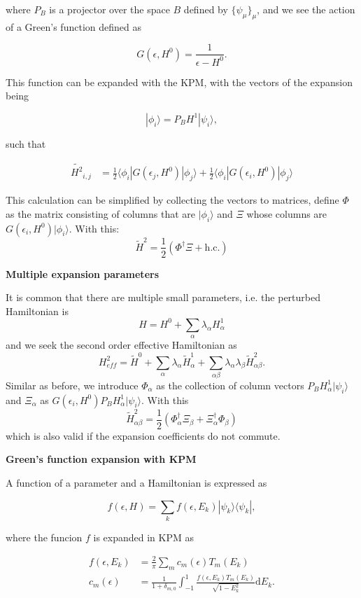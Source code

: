 \documentclass[10pt, onecolumn, aps, prb, superscriptaddress, floatfix, showpacs, notitlepage]{revtex4-1}
\newcommand{\bra}[1]{\langle #1|}
\newcommand{\ket}[1]{|#1\rangle}
\begin{document}
where $P_B$ is a projector over the space $B$ defined by $\{\psi_\mu\}_\mu$,
and we see the action of a Green's function defined as

$$
G(\epsilon, H^0) = \frac{1}{\epsilon-H^0}.
$$

This function can be expanded with the KPM, with the vectors of the expansion
being

$$
\ket{\phi_i} = P_B H^1\ket{\psi_i},
$$


such that


\begin{align}
\tilde{H^2}_{i,j} &= \frac{1}{2}
\bra{\phi_i} G(\epsilon_j, H^0) \ket{\phi_j}
+
\frac{1}{2}
\bra{\phi_i} G(\epsilon_i, H^0) \ket{\phi_j}
\end{align}

This calculation can be simplified by collecting the vectors to matrices, define $\Phi$ as the matrix consisting of columns that are $\ket{\phi_i}$ and $\Xi$ whose columns are $G(\epsilon_i, H^0) \ket{\phi_i}$. With this:
\begin{equation}
\tilde{H}^2 = \frac{1}{2} (\Phi^\dag \Xi + \text{h.c.})
\end{equation}

\textbf{Multiple expansion parameters}

It is common that there are multiple small parameters, i.e. the perturbed Hamiltonian is
\[H = H^0 + \sum_{\alpha} \lambda_{\alpha} H^1_{\alpha}\]
and we seek the second order effective Hamiltonian as
\[H_{eff}^2 = \tilde{H}^0 +  \sum_{\alpha} \lambda_{\alpha} \tilde{H}^1_{\alpha} +  \sum_{\alpha\beta} \lambda_{\alpha}\lambda_{\beta}\tilde{H}^2_{\alpha\beta}.\]
Similar as before, we introduce $\Phi_{\alpha}$ as the collection of column vectors $P_B H^1_{\alpha}\ket{\psi_i}$ and $\Xi_{\alpha}$ as $G(\epsilon_i, H^0) P_B H^1_{\alpha}\ket{\psi_i}$. With this
\[\tilde{H}^2_{\alpha\beta} = \frac{1}{2} (\Phi_{\alpha}^\dag \Xi_{\beta} + \Xi_{\alpha}^\dag\Phi_{\beta})\]
which is also valid if the expansion coefficients do not commute.

\textbf{Green's function expansion with KPM}

A function of a parameter and a Hamiltonian is expressed as

$$
f(\epsilon, H) = \sum_k f(\epsilon, E_k) \ket{\psi_k}\bra{\psi_k},
$$

where the funcion $f$ is expanded in KPM as

\begin{align}
f(\epsilon, E_k) &= \frac{2}{\pi}\sum_m c_m(\epsilon)T_m(E_k)\\
c_m(\epsilon) &=\frac{1}{1+\delta_{m,0}}
\int_{-1}^1 \frac{f(\epsilon, E_k) T_m(E_k)}{\sqrt{1-E_k^2}}\mathrm{d}E_k.
\end{align}
\end{document}
